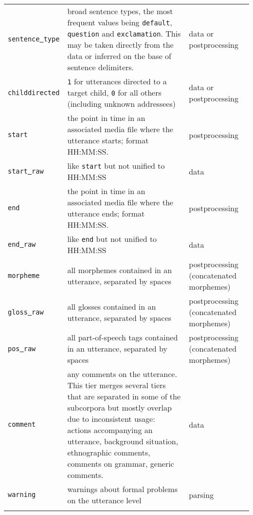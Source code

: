 \documentclass[a4paper, 11pt]{book}
\newcommand{\und}{\underline{{ }}\hspace{0.2mm}}	%
\begin{document}
\begin{longtable}{lp{.5\linewidth}p{.2\linewidth}}
		\texttt{sentence\und type} &	broad sentence types, the most frequent values being \texttt{default}, \texttt{question} and \texttt{exclamation}. This may be taken directly from the data or inferred on the base of sentence delimiters. & data or postprocessing \\
		\texttt{childdirected} & \texttt{1} for utterances directed to a target child,
								 \texttt{0} for all others (including unknown addressees) & data or postprocessing \\
		\texttt{start}			& the point in time in an associated media file where the utterance starts; format HH:MM:SS. & postprocessing \\ 
		\texttt{start\und raw} 	& like \texttt{start} but not unified to HH:MM:SS & data \\
		\texttt{end}			& the point in time in an associated media file where the utterance ends; format HH:MM:SS. & postprocessing \\
		
		\texttt{end\und raw}	& like \texttt{end} but not unified to HH:MM:SS & data \\
		\texttt{morpheme}		& all morphemes contained in an utterance, separated by spaces & postprocessing (concatenated morphemes) \\
		\texttt{gloss\und raw}  & all glosses contained in an utterance, separated by spaces & postprocessing (concatenated morphemes) \\
		\texttt{pos\und raw}	& all part-of-speech tags contained in an utterance, separated by spaces & postprocessing (concatenated morphemes) \\
		\texttt{comment}		& any comments on the utterance. This tier merges several tiers that are separated in some of the subcorpora 
									but mostly overlap due to inconsistent usage: actions accompanying an utterance, background situation, ethnographic comments, comments on grammar, generic comments. & data \\
		\texttt{warning}	& warnings about formal problems on the utterance level & parsing \\[-0.3cm]
			
	\label{tab:Table utterances}
\end{longtable}

\end{document}
